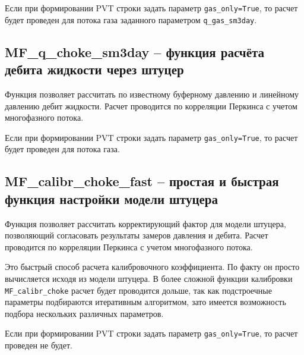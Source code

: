 Если при формировании PVT строки задать параметр \texttt{gas_only=True}, то расчет будет проведен для потока газа заданного параметром \texttt{q_gas_sm3day}.



\subsection{MF\_q\_choke\_sm3day – функция расчёта дебита жидкости через штуцер}
Функция позволяет рассчитать по известному буферному давлению и линейному давлению дебит жидкости. Расчет  проводится по корреляции Перкинса \cite{Perkins_1993} с учетом многофазного потока.  


Если при формировании PVT строки задать параметр \texttt{gas_only=True}, то расчет будет проведен для потока газа.

\subsection{MF\_calibr\_choke\_fast – простая и быстрая функция настройки модели штуцера}
Функция позволяет рассчитать корректирующий фактор для модели штуцера, позволяющий согласовать результаты замеров давления и дебита. Расчет проводится по корреляции Перкинса \cite{Perkins_1993} с учетом многофазного потока.  

Это быстрый способ расчета калибровочного коэффициента. По факту он просто вычисляется исходя из модели штуцера.
В более сложной функции калибровки \texttt{MF_calibr_choke} расчет будет проводится дольше, так как подстроечные параметры подбираются итеративным алгоритмом, зато имеется возможность подбора нескольких различных параметров.


Если при формировании PVT строки задать параметр \texttt{gas_only=True}, то расчет проведен не будет.


